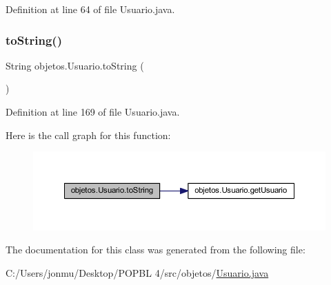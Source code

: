 Definition at line 64 of file Usuario.\+java.

\mbox{\label{classobjetos_1_1_usuario_a60bfdc7b6f95b380ed50723c1e9b1cc6}} 
\subsubsection{\texorpdfstring{to\+String()}{toString()}}
{\footnotesize\ttfamily String objetos.\+Usuario.\+to\+String (\begin{DoxyParamCaption}{ }\end{DoxyParamCaption})}



Definition at line 169 of file Usuario.\+java.

Here is the call graph for this function\+:
\nopagebreak
\begin{figure}[H]
\begin{center}
\leavevmode
\includegraphics[width=350pt]{classobjetos_1_1_usuario_a60bfdc7b6f95b380ed50723c1e9b1cc6_cgraph}
\end{center}
\end{figure}


The documentation for this class was generated from the following file\+:\begin{DoxyCompactItemize}
\item 
C\+:/\+Users/jonmu/\+Desktop/\+P\+O\+P\+B\+L 4/src/objetos/\mbox{\hyperlink{_usuario_8java}{Usuario.\+java}}\end{DoxyCompactItemize}
